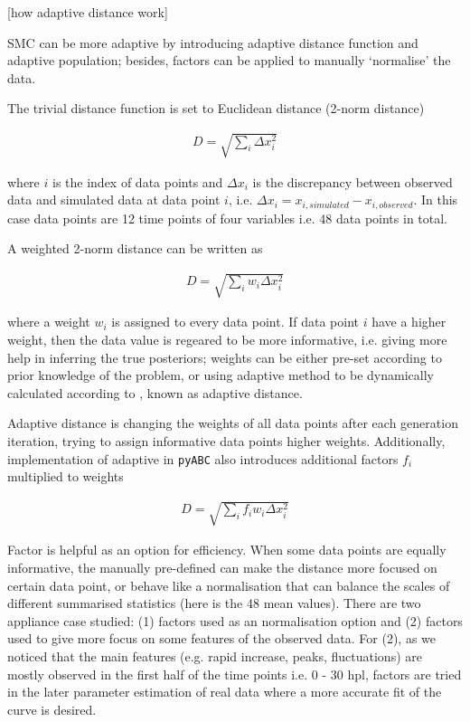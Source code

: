 \documentclass[12pt,a4paper]{report}
\begin{document}
[how adaptive distance work]

SMC can be more adaptive by introducing adaptive distance function and adaptive population; besides, factors can be applied to manually `normalise' the data.

The trivial distance function is set to Euclidean distance (2-norm distance)

\begin{align}
    \label{eq:dis}
    D=\sqrt{\sum_i \Delta x_i^2}
\end{align}

where $i$ is the index of data points and $\Delta x_i$ is the discrepancy between  observed data and simulated data at data point $i$, i.e. $\Delta x_i = x_{i, simulated}-x_{i, observed}$. In this case data points are 12 time points of four variables i.e. 48 data points in total.

A weighted 2-norm distance can be written as

\begin{align}
    \label{dis_w}
    D=\sqrt{\sum_i w_i \Delta x_i^2}
\end{align}

where a weight $w_i$ is assigned to every data point. If data point $i$ have a higher weight, then the data value is regeared to be more informative, i.e. giving more help in inferring the true posteriors; weights can be either pre-set according to prior knowledge of the problem, or using adaptive method to be dynamically calculated according to , known as adaptive distance.

Adaptive distance is changing the weights of all data points after each generation iteration, trying to assign informative data points higher weights. Additionally, implementation of adaptive in \verb|pyABC| also introduces additional factors $f_i$ multiplied to weights \cite{ref:adpt_dis}

\begin{align}
    \label{dis_f}
    D=\sqrt{\sum_i f_iw_i \Delta x_i^2}
\end{align}

Factor is helpful as an option for efficiency. When some data points are equally informative, the manually pre-defined can make the distance more focused on certain data point, or behave like a normalisation that can balance the scales of different summarised statistics (here is the 48 mean values). There are two appliance case studied: (1) factors used as an normalisation option and (2) factors used to give more focus on some features of the observed data. For (2), as we noticed that the main features (e.g. rapid increase, peaks, fluctuations) are mostly observed in the first half of the time points i.e. 0 - 30 hpl, factors are tried in the later parameter estimation of real data where a more accurate fit of the curve is desired.
\end{document}
